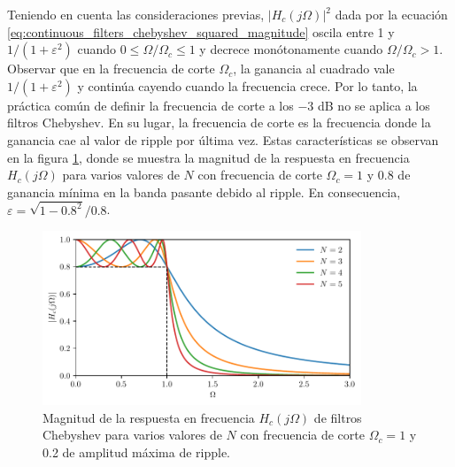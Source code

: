 \documentclass[a4paper]{report}
\begin{document}
Teniendo en cuenta las consideraciones previas, \(|H_c(j\Omega)|^2\) dada por la ecuación \ref{eq:continuous_filters_chebyshev_squared_magnitude} oscila entre 1 y \(1/(1+\varepsilon^2)\) cuando \(0\leq\Omega/\Omega_c\leq1\) y decrece monótonamente cuando \(\Omega/\Omega_c>1\). Observar que en la frecuencia de corte \(\Omega_c\), la ganancia al cuadrado vale \(1/(1+\varepsilon^2)\) y continúa cayendo cuando la frecuencia crece. Por lo tanto, la práctica común de definir la frecuencia de corte a los \(-3\) dB no se aplica a los filtros Chebyshev. En su lugar, la frecuencia de corte es la frecuencia donde la ganancia cae al valor de ripple por última vez. Estas características se observan en la figura \ref{fig:continuous_filters_chebyshev_responses}, donde se muestra la magnitud de la respuesta en frecuencia \(H_c(j\Omega)\) para varios valores de \(N\) con frecuencia de corte \(\Omega_c=1\) y \(0.8\) de ganancia mínima en la banda pasante debido al ripple. En consecuencia, \(\varepsilon=\sqrt{1-0.8^2}/0.8\).
\begin{figure}[!htb]
 \begin{center}
 \includegraphics[width=0.85\textwidth]{figuras/continuous_filters_chebyshev_responses.pdf}
 \caption{\label{fig:continuous_filters_chebyshev_responses} Magnitud de la respuesta en frecuencia \(H_c(j\Omega)\) de filtros Chebyshev para varios valores de \(N\) con frecuencia de corte \(\Omega_c=1\) y 0.2 de amplitud máxima de ripple.}
 \end{center}
\end{figure}
\end{document}
